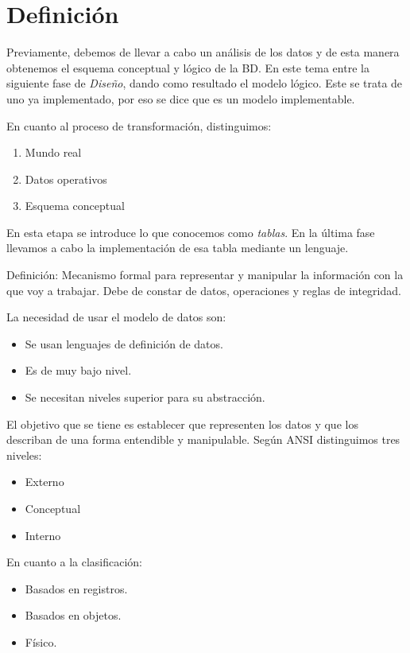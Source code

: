 \section{Definición}

Previamente, debemos de llevar a cabo un análisis de los datos y de esta manera obtenemos el esquema conceptual y lógico de la BD. En este tema entre la siguiente fase de \textit{Diseño}, dando como resultado el modelo lógico. Este se trata de uno ya implementado, por eso se dice que es un modelo implementable. 

En cuanto al proceso de transformación, distinguimos:

\begin{enumerate}
    \item Mundo real 
    \item Datos operativos
    \item Esquema conceptual
\end{enumerate}

En esta etapa se introduce lo que conocemos como \textit{tablas}. En la última fase llevamos a cabo la implementación de esa tabla mediante un lenguaje.

Definición: Mecanismo formal para representar y manipular la información con la que voy a trabajar. Debe de constar de datos, operaciones y reglas de integridad.

La necesidad de usar el modelo de datos son:
\begin{itemize}
    \item Se usan lenguajes de definición de datos.
    \item Es de muy bajo nivel.
    \item Se necesitan niveles superior para su abstracción.
\end{itemize}

El objetivo que se tiene es establecer que representen los datos y que los describan de una forma entendible y manipulable. Según ANSI distinguimos tres niveles:
\begin{itemize}
    \item Externo
    \item Conceptual
    \item Interno
\end{itemize}

En cuanto a la clasificación:
\begin{itemize}
    \item Basados en registros.
    \item Basados en objetos.
    \item Físico.
\end{itemize}

